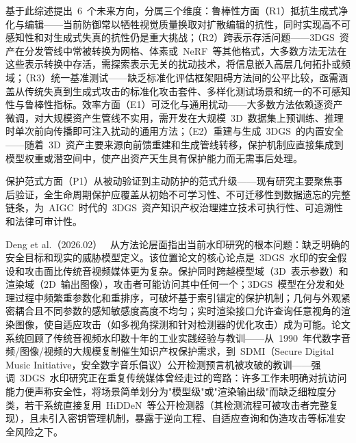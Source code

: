 基于此综述提出~6~个未来方向，分属三个维度：鲁棒性方面（R1）抵抗生成式净化与编辑——当前防御常以牺牲视觉质量换取对扩散编辑的抗性，同时实现高不可感知性和对生成式失真的抗性仍是重大挑战；（R2）跨表示存活问题——3DGS~资产在分发管线中常被转换为网格、体素或~NeRF~等其他格式，大多数方法无法在这些表示转换中存活，需探索表示无关的扰动技术，将信息嵌入高层几何拓扑或频域；（R3）统一基准测试——缺乏标准化评估框架阻碍方法间的公平比较，亟需涵盖从传统失真到生成式攻击的标准化攻击套件、多样化测试场景和统一的不可感知性与鲁棒性指标。效率方面（E1）可泛化与通用扰动——大多数方法依赖逐资产微调，对大规模资产生管线不实用，需开发在大规模~3D~数据集上预训练、推理时单次前向传播即可注入扰动的通用方法；（E2）重建与生成~3DGS~的内置安全——随着~3D~资产主要来源向前馈重建和生成管线转移，保护机制应直接集成到模型权重或潜空间中，使产出资产天生具有保护能力而无需事后处理。

保护范式方面（P1）从被动验证到主动防护的范式升级——现有研究主要聚焦事后验证，全生命周期保护应覆盖从初始不可学习性、不可迁移性到数据遗忘的完整链条，为~AIGC~时代的~3DGS~资产知识产权治理建立技术可执行性、可追溯性和法律可审计性。

Deng et al.（2026.02）~\cite{2602_02602} 从方法论层面指出当前水印研究的根本问题：缺乏明确的安全目标和现实的威胁模型定义。该位置论文的核心论点是~3DGS~水印的安全假设和攻击面比传统音视频媒体更为复杂。保护同时跨越模型域（3D~表示参数）和渲染域（2D~输出图像），攻击者可能访问其中任何一个；3DGS~模型在分发和处理过程中频繁重参数化和重排序，可破坏基于索引锚定的保护机制；几何与外观紧密耦合且不同参数的感知敏感度高度不均匀；实时渲染接口允许查询任意视角的渲染图像，使自适应攻击（如多视角探测和针对检测器的优化攻击）成为可能。论文系统回顾了传统音视频水印数十年的工业实践经验与教训——从~1990~年代数字音频/图像/视频的大规模复制催生知识产权保护需求，到~SDMI（Secure Digital Music Initiative，安全数字音乐倡议）公开检测预言机被攻破的教训——强调~3DGS~水印研究正在重复传统媒体曾经走过的弯路：许多工作未明确对抗访问能力便声称安全性，将场景简单划分为"模型级"或"渲染输出级"而缺乏细粒度分类，若干系统直接复用~HiDDeN~等公开检测器（其检测流程可被攻击者完整复现），且未引入密钥管理机制，暴露于逆向工程、自适应查询和伪造攻击等标准安全风险之下。

